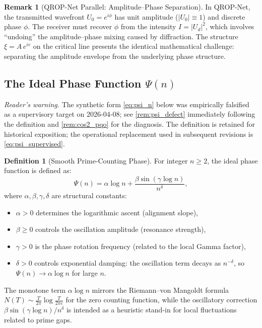 \documentclass[11pt, a4paper]{article}
\theoremstyle{definition}
\newtheorem{definition}{Definition}[section]
\newtheorem{remark}{Remark}[section]
\theoremstyle{plain}
\newcommand{\xif}{\xi}                      %
\newcommand{\Ampl}{A}                       %
\newcommand{\Psip}{\Psi}                    %
\begin{document}
\begin{remark}[QROP-Net Parallel: Amplitude--Phase Separation]
\label{rem:amp_phase}
In QROP-Net, the transmitted wavefront $U_0 = e^{i\phi}$ has unit
amplitude ($|U_0| \equiv 1$) and discrete phase $\phi$. The receiver
must recover $\phi$ from the intensity $I = |U_d|^2$, which involves
``undoing'' the amplitude--phase mixing caused by diffraction. The
structure $\xif = \Ampl\,e^{iv}$ on the critical line presents the
identical mathematical challenge: separating the amplitude envelope
from the underlying phase structure.
\end{remark}


\subsection{The Ideal Phase Function $\Psip(n)$}

\noindent\textit{Reader's warning.} The synthetic form
\cref{eq:psi_n} below was empirically falsified as a supervisory
target on 2026-04-08; see \cref{rem:psi_defect} immediately following
the definition and \cref{rem:cos2_pqo} for the diagnosis. The
definition is retained for historical exposition; the operational
replacement used in subsequent revisions is \cref{eq:psi_supervised}.

\begin{definition}[Smooth Prime-Counting Phase]
\label{def:psi}
For integer $n \geq 2$, the ideal phase function is defined as:
\begin{equation}
  \Psip(n) = \alpha\log n +
  \frac{\beta\sin(\gamma\log n)}{n^\delta},
  \label{eq:psi_n}
\end{equation}
where $\alpha, \beta, \gamma, \delta$ are structural constants:
\begin{itemize}
  \item $\alpha > 0$ determines the logarithmic ascent (alignment slope),
  \item $\beta \geq 0$ controls the oscillation amplitude (resonance
        strength),
  \item $\gamma > 0$ is the phase rotation frequency (related to the
        local Gamma factor),
  \item $\delta > 0$ controls exponential damping: the oscillation term
        decays as $n^{-\delta}$, so $\Psip(n) \to \alpha\log n$ for
        large $n$.
\end{itemize}
\end{definition}

The monotone term $\alpha\log n$ mirrors the Riemann--von Mangoldt
formula $N(T) \sim \frac{T}{2\pi}\log\frac{T}{2\pi e}$ for the zero
counting function, while the oscillatory correction $\beta\sin(\gamma
\log n)/n^\delta$ is intended as a heuristic stand-in for local
fluctuations related to prime gaps.
\end{document}
